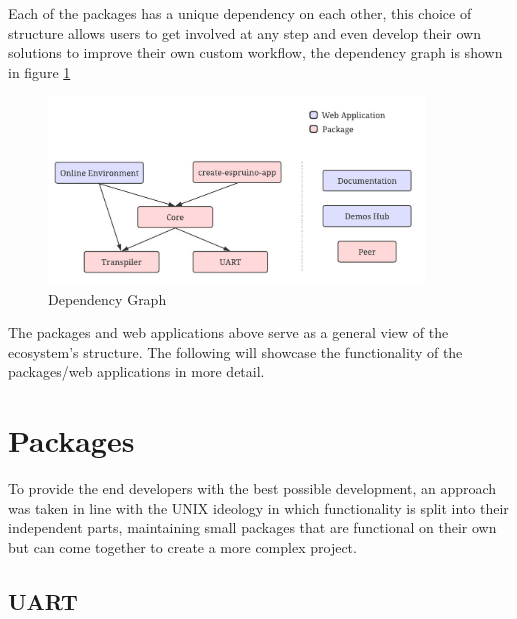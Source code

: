 \documentclass{l4proj}
\begin{document}
Each of the packages has a unique dependency on each other, this choice of structure allows users to get involved at any step and even develop their own solutions to improve their own custom workflow, the dependency graph is shown in figure \ref{fig:package_dep_graph}


\begin{figure}[!ht]
    \centering
    \includegraphics[width=10cm]{dissertation/images/Package_dependency_graph.jpeg}
    \caption{Dependency Graph}
    \label{fig:package_dep_graph}
\end{figure}

The packages and web applications above serve as a general view of the ecosystem's structure. The following will showcase the functionality of the packages/web applications in more detail.

\section{Packages}

To provide the end developers with the best possible development, an approach was taken in line with the UNIX ideology \cite{TheArtOfUNIXProgramming} in which functionality is split into their independent parts, maintaining small packages that are functional on their own but can come together to create a more complex project.

\subsection{UART}
\end{document}
